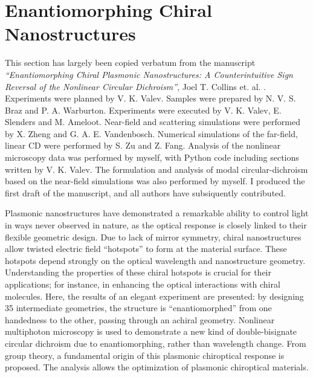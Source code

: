 \chapter{Enantiomorphing Chiral Nanostructures}\label{sec:results:EnantiomorphingChiralCrosses}


This section has largely been copied verbatum from the manuscript \textit{``Enantiomorphing Chiral Plasmonic Nanostructures: A Counterintuitive Sign Reversal of the Nonlinear Circular Dichroism''}, Joel T. Collins et. al. \cite{Collins2018}. 
Experiments were planned by V. K. Valev. Samples were prepared by N. V. S. Braz and P. A. Warburton. Experiments were executed by V. K. Valev, E. Slenders and M. Ameloot. Near-field and scattering simulations were performed by X. Zheng and G. A. E. Vandenbosch. Numerical simulations of the far-field, linear CD were performed by S. Zu and Z. Fang. 
Analysis of the nonlinear microscopy data was performed by myself, with Python code including sections written by V. K. Valev. The formulation and analysis of modal circular-dichroism based on the near-field simulations was also performed by myself. I produced the first draft of the manuscript, and all authors have subsiquently contributed. 

\bigskip \noindent
Plasmonic nanostructures have demonstrated a remarkable ability to control light in ways never observed in nature, as the optical response is closely linked to their flexible geometric design.
Due to lack of mirror symmetry, chiral nanostructures allow twisted electric field “hotspots” to form at the material surface. 
These hotspots depend strongly on the optical wavelength and nanostructure geometry.
Understanding the properties of these chiral hotspots is crucial for their applications; for instance, in enhancing the optical interactions with chiral molecules. 
Here, the results of an elegant experiment are presented: by designing 35 intermediate geometries, the structure is “enantiomorphed” from one handedness to the other, passing through an achiral geometry. 
Nonlinear multiphoton microscopy is used to demonstrate a new kind of double-bisignate circular dichroism due to enantiomorphing, rather than wavelength change.
From group theory, a fundamental origin of this plasmonic chiroptical response is proposed. The analysis allows the optimization of plasmonic chiroptical materials.


